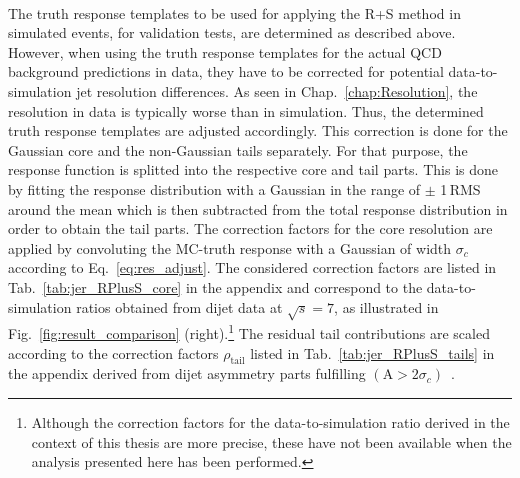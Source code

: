 \begin{table}[!t]
\centering
\caption{Overview of the $|\eta^\mathrm{gen}|$ and $\pt^\mathrm{gen}$ interval boundaries used for the MC-truth response determination used as input for the R+S method.}
\label{tab:RPlusS_binning}
\end{table} 
\\
The truth response templates to be used for applying the R+S method in simulated events, \eg for validation tests, are determined as described above. However, when using the truth response templates for the actual QCD background predictions in data, they have to be corrected for potential data-to-simulation jet resolution differences. As seen in Chap.~\ref{chap:Resolution}, the resolution in data is typically worse than in simulation. Thus, the determined truth response templates are adjusted accordingly. This correction is done for the Gaussian core and the non-Gaussian tails separately. For that purpose, the response function is splitted into the respective core and tail parts. This is done by fitting the response distribution with a Gaussian in the range of $\pm$ 1\,RMS around the mean which is then subtracted from the total response distribution in order to obtain the tail parts. The correction factors for the core resolution are applied by convoluting the MC-truth response with a Gaussian of width $\sigma_{c}$ according to Eq.~\ref{eq:res_adjust}. The considered correction factors are listed in Tab.~\ref{tab:jer_RPlusS_core} in the appendix and correspond to the data-to-simulation ratios obtained from dijet data at $\sqrt{s} = 7$\tev, as illustrated in Fig.~\ref{fig:result_comparison} (right).\footnote{Although the correction factors for the data-to-simulation ratio derived in the context of this thesis are more precise, these have not been available when the analysis presented here has been performed.} The residual tail contributions are scaled according to the correction factors $\rho_\mathrm{tail}$ listed in Tab.~\ref{tab:jer_RPlusS_tails} in the appendix derived from dijet asymmetry parts fulfilling $(\mathrm{A} > 2 \sigma_c)$~\cite{thesis:Schroeder}.   


